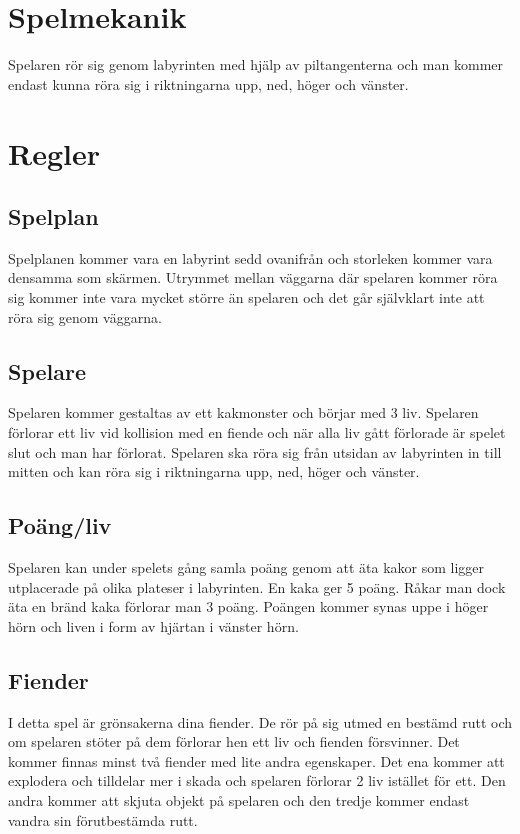 \documentclass{TDP005mall}
\begin{document}
\section{Spelmekanik}
Spelaren rör sig genom labyrinten med hjälp av piltangenterna och man kommer
endast kunna röra sig i riktningarna upp, ned, höger och vänster. 

\newpage

\section{Regler}
\subsection{Spelplan}
Spelplanen kommer vara en labyrint sedd ovanifrån och storleken
kommer vara densamma som skärmen. Utrymmet mellan väggarna där spelaren kommer
röra sig kommer inte vara mycket större än spelaren och det går självklart inte
att röra sig genom väggarna.

\subsection{Spelare}
Spelaren kommer gestaltas av ett kakmonster och börjar med 3 liv. Spelaren
förlorar ett liv vid kollision med en fiende och när alla liv gått förlorade är
spelet slut och man har förlorat. Spelaren ska röra sig från utsidan av
labyrinten in till mitten och kan röra sig i riktningarna upp, ned, höger och
vänster.

\subsection{Poäng/liv}
Spelaren kan under spelets gång samla poäng genom att äta kakor som ligger
utplacerade på olika plateser i labyrinten. En kaka ger 5 poäng. Råkar man
dock äta en bränd kaka förlorar man 3 poäng. Poängen kommer synas uppe i
höger hörn och liven i form av hjärtan i vänster hörn.


\subsection{Fiender}
I detta spel är grönsakerna dina fiender. De rör på sig utmed en bestämd rutt
och om spelaren stöter på dem förlorar hen ett liv och fienden
försvinner. Det kommer finnas minst två fiender med lite andra egenskaper. Det
ena kommer att explodera och tilldelar mer i skada och spelaren förlorar 2 liv
istället för ett. Den andra kommer att skjuta objekt på spelaren och den tredje
kommer endast vandra sin förutbestämda rutt.
\end{document}
